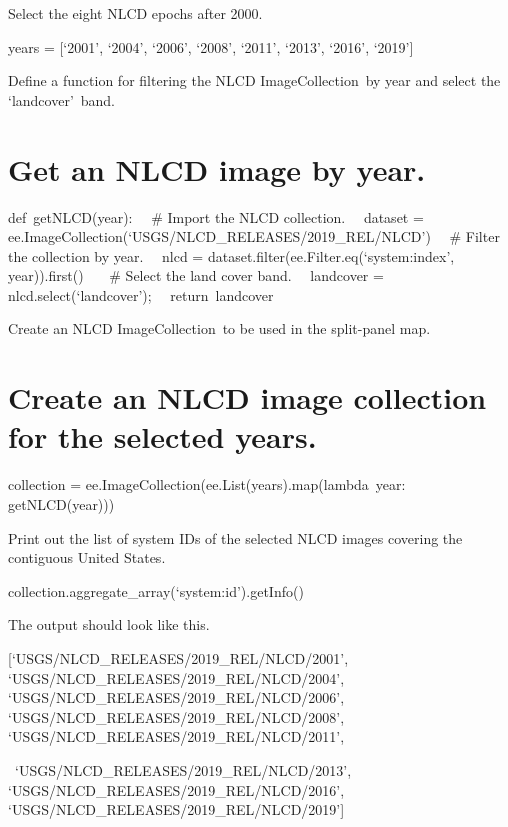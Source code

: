 \documentclass[
  letterpaper,
  DIV=11,
  numbers=noendperiod]{scrreprt}
\begin{document}
Select the eight NLCD epochs after 2000.

years = {[}`2001', `2004', `2006', `2008', `2011', `2013', `2016',
`2019'{]}

Define a function for filtering the NLCD ImageCollection~by year and
select the `landcover'~band.

\hypertarget{get-an-nlcd-image-by-year.}{%
\chapter{Get an NLCD image by year.}\label{get-an-nlcd-image-by-year.}}

def~getNLCD(year):~ ~\# Import the NLCD collection.~ ~dataset =
ee.ImageCollection(`USGS/NLCD\_RELEASES/2019\_REL/NLCD')~ ~\# Filter the
collection by year.~ ~nlcd = dataset.filter(ee.Filter.eq(`system:index',
year)).first()~~ ~\# Select the land cover band.~ ~landcover =
nlcd.select(`landcover');~ ~return~landcover

Create an NLCD ImageCollection~to be used in the split-panel map.

\hypertarget{create-an-nlcd-image-collection-for-the-selected-years.}{%
\chapter{Create an NLCD image collection for the selected
years.}\label{create-an-nlcd-image-collection-for-the-selected-years.}}

collection = ee.ImageCollection(ee.List(years).map(lambda~year:
getNLCD(year)))

Print out the list of system IDs of the selected NLCD images covering
the contiguous United States.

collection.aggregate\_array(`system:id').getInfo()

The output should look like this.

{[}`USGS/NLCD\_RELEASES/2019\_REL/NLCD/2001',\\
`USGS/NLCD\_RELEASES/2019\_REL/NLCD/2004',\\
`USGS/NLCD\_RELEASES/2019\_REL/NLCD/2006',\\
`USGS/NLCD\_RELEASES/2019\_REL/NLCD/2008',\\
`USGS/NLCD\_RELEASES/2019\_REL/NLCD/2011',

~`USGS/NLCD\_RELEASES/2019\_REL/NLCD/2013',\\
`USGS/NLCD\_RELEASES/2019\_REL/NLCD/2016',\\
`USGS/NLCD\_RELEASES/2019\_REL/NLCD/2019'{]}
\end{document}
